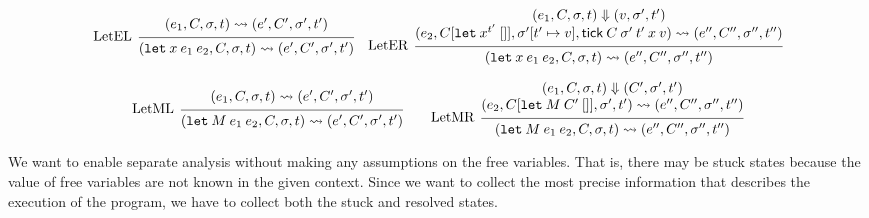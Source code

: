 \documentclass{article}
\theoremstyle{definition}
\newcommand*{\tick}{\mathsf{tick}}
\begin{document}
\[
  \begin{prooftree}
    \hypo{
      \begin{matrix}
        (e_{1}, C, \sigma, t)
        \rightsquigarrow
        (e', C', \sigma', t')
      \end{matrix}
    }
    \infer[left label=LetEL]1{
    (\mathtt{let}\:x\:e_1\:e_2, C, \sigma, t)
    \rightsquigarrow
    (e', C', \sigma', t')
    }
  \end{prooftree}\quad
  \begin{prooftree}
    \hypo{
      \begin{matrix}
        (e_{1}, C, \sigma, t)
        \Downarrow
        (v, \sigma', t') \\
        (e_{2}, C[\mathtt{let}\:x^{t'}\:[]], \sigma'[t'\mapsto v], \tick\:C\:\sigma'\:t'\:x\:v)
        \rightsquigarrow
        (e'', C'', \sigma'', t'')
      \end{matrix}
    }
    \infer[left label=LetER]1{
    (\mathtt{let}\:x\:e_1\:e_2, C, \sigma, t)
    \rightsquigarrow
    (e'', C'', \sigma'', t'')
    }
  \end{prooftree}
\]

\[
  \begin{prooftree}
    \hypo{
      \begin{matrix}
        (e_{1}, C, \sigma, t)
        \rightsquigarrow
        (e', C', \sigma', t')
      \end{matrix}
    }
    \infer[left label=LetML]1{
    (\mathtt{let}\:M\:e_{1}\:e_{2}, C, \sigma, t)
    \rightsquigarrow
    (e', C', \sigma', t')
    }
  \end{prooftree}\qquad
  \begin{prooftree}
    \hypo{
      \begin{matrix}
        (e_{1}, C, \sigma, t)
        \Downarrow
        (C', \sigma', t') \\
        (e_{2}, C[\mathtt{let}\:M\:C'\:[]], \sigma', t')
        \rightsquigarrow
        (e'', C'', \sigma'', t'')
      \end{matrix}
    }
    \infer[left label=LetMR]1{
    (\mathtt{let}\:M\:e_{1}\:e_{2}, C, \sigma, t)
    \rightsquigarrow
    (e'', C'', \sigma'', t'')
    }
  \end{prooftree}
\]

We want to enable separate analysis without making any assumptions on the free variables.
That is, there may be stuck states because the value of free variables are not known in the given context.
Since we want to collect the most precise information that describes the execution of the program, we have to collect both the stuck and resolved states.
\end{document}
